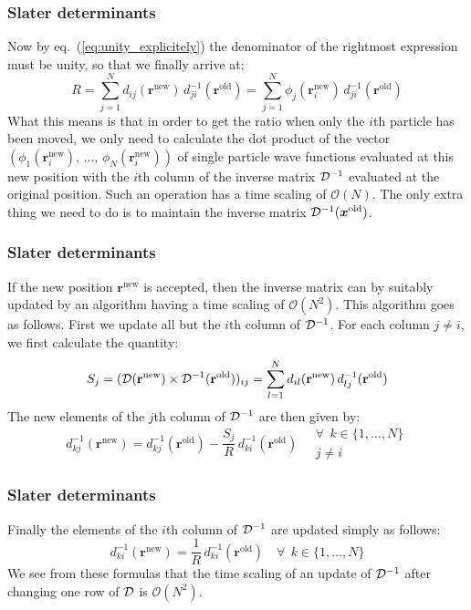 \documentclass[compress]{beamer}
\newcommand{\be}{\begin{equation}}
\newcommand{\ee}{\end{equation}}
\newcommand{\matr}[1]{{\bf \cal{#1}}}
\renewcommand{\vec}[1]{\boldsymbol{#1}}
\renewcommand{\det}[1]{|#1|}
\newcommand{\bigO}{\mathcal{O}}
\newcommand{\be}{\begin{equation}}                        %
\newcommand{\ee}{\end{equation}}                          %
\begin{document}
\frame
{
  \frametitle{Slater determinants}
\begin{small}
{\scriptsize
Now by eq.~(\ref{eq:unity_explicitely}) the denominator of the rightmost
expression must be unity, so that we finally arrive at:
\be
R =
\sum_{j=1}^N d_{ij}(\mathbf{r}^{\mathrm{new}})\,
d_{ji}^{-1}(\mathbf{r}^{\mathrm{old}}) = 
\sum_{j=1}^N \phi_j(\mathbf{r}_i^{\mathrm{new}})\,
d_{ji}^{-1}(\mathbf{r}^{\mathrm{old}})
\label{eq:detratio_inverse}
\ee
What this means is that in order to get the ratio when only the $i$th
particle  has been moved, we only need to calculate the dot
product of the vector $\left(\phi_1(\mathbf{r}_i^\mathrm{new}),\,\dots,\,
\phi_N(\mathbf{r}_i^\mathrm{new})\right)$ of single particle  wave functions
evaluated at this new position with the $i$th column of the inverse
matrix $\matr D^{-1}$ evaluated at the original position. Such
an operation has a time scaling of $\bigO(N)$. The only extra thing we
need to do is to maintain the inverse matrix $\matr D^{-1}(\vec
x^{\mathrm{old}})$.
}
\end{small}
}

\frame
{
  \frametitle{Slater determinants}
\begin{small}
{\scriptsize
If the new position $\mathbf{r}^{\mathrm{new}}$ is accepted, then the
inverse matrix can by suitably updated by an algorithm having a time
scaling of $\bigO(N^2)$.  This algorithm goes as
follows. First we update all but the $i$th column of $\matr
D^{-1}$. For each column $j\neq i$, we first calculate the quantity:
\be
S_j =
(\matr D(\mathbf{r}^{\mathrm{new}})\times
\matr D^{-1}(\mathbf{r}^{\mathrm{old}}))_{ij} =
\sum_{l=1}^N d_{il}(\mathbf{r}^{\mathrm{new}})\,
d^{-1}_{lj}(\mathbf{r}^{\mathrm{old}})
\label{eq:inverse_update_1}
\ee
The new elements of the $j$th column of $\matr D^{-1}$ are then given
by:
\be
d_{kj}^{-1}(\mathbf{r}^{\mathrm{new}}) =
d_{kj}^{-1}(\mathbf{r}^{\mathrm{old}}) -
\frac{S_j}{R}\,d_{ki}^{-1}(\mathbf{r}^{\mathrm{old}})\quad
\begin{array}{ll}
\forall\ \ k\in\{1,\dots,N\}\\j\neq i
\end{array}
\label{eq:inverse_update_2}
\ee
}
\end{small}
}

\frame
{
  \frametitle{Slater determinants}
\begin{small}
{\scriptsize
Finally the elements of the $i$th column of $\matr D^{-1}$ are updated
simply as follows:
\be
d_{ki}^{-1}(\mathbf{r}^{\mathrm{new}}) =
\frac{1}{R}\,d_{ki}^{-1}(\mathbf{r}^{\mathrm{old}})\quad
\forall\ \ k\in\{1,\dots,N\}
\label{eq:inverse_update_3}
\ee
We see from these formulas that the time scaling of an update of
$\matr D^{-1}$ after changing one row of $\matr D$ is $\bigO(N^2)$.
}
\end{small}
}
\end{document}
